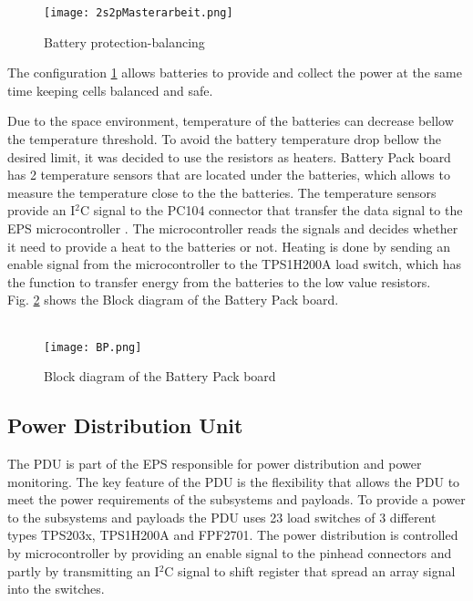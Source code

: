   \begin{figure}[h]
  	\centering
  	\texttt{[image: 2s2pMasterarbeit.png]}
  	\caption{Battery protection-balancing}
  	\label{fig: Bat_prot_bal}
  \end{figure}
  
  The configuration \ref{fig: Bat_prot_bal} allows batteries to provide and collect the power at the same time keeping cells balanced and safe.
  
  Due to the space environment, temperature of the batteries can decrease bellow the temperature threshold. To avoid the battery temperature drop bellow the desired limit, it was decided to use the resistors as heaters. Battery Pack board has 2 temperature sensors that are located under the batteries, which allows to measure the temperature close to the the batteries. The temperature sensors provide an I$^{2}$C signal to the PC104 connector that transfer the data signal to the EPS microcontroller . The microcontroller reads the signals and decides whether it need to provide a heat to the batteries or not. Heating is done by sending an enable signal from the microcontroller to the TPS1H200A load switch, which has the function to transfer energy from the batteries to the low value resistors.  \\ 
   Fig. \ref{fBP} shows the Block diagram of the Battery Pack board. \\ \\ 
  
  
  \begin{figure}[h]
  	\centering
  	\texttt{[image: BP.png]}
  	\caption{Block diagram of the Battery Pack board}
  	\label{fBP}
  \end{figure} 
   
  
  \subsection{Power Distribution Unit}
  The PDU is part of the EPS responsible for power distribution and power monitoring. The key feature of the PDU is the flexibility that allows the PDU to meet the power requirements of the subsystems and payloads. To provide a power to the subsystems and payloads the PDU uses 23 load switches of 3 different types TPS203x, TPS1H200A and FPF2701. The power distribution is controlled by microcontroller by providing an enable signal to the pinhead connectors and partly by transmitting an I$^2$C signal to shift register that spread an array signal into the switches. 
  

